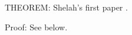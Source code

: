 



\nocite{big}
\nocite{Sh:1}
\nocite{small} 

THEOREM: Shelah's first paper \cite{Bishop2006a}. 

Proof: See below. 


